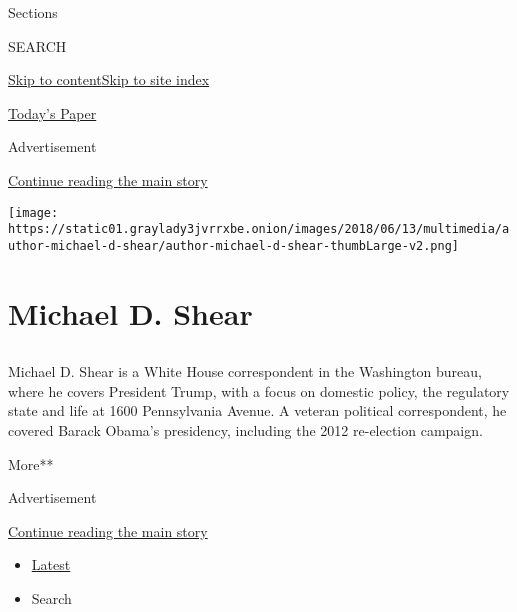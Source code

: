Sections

SEARCH

\protect\hyperlink{site-content}{Skip to
content}\protect\hyperlink{site-index}{Skip to site index}

\href{https://myaccount.nytimes3xbfgragh.onion/auth/login?response_type=cookie\&client_id=vi}{}

\href{https://www.nytimes3xbfgragh.onion/section/todayspaper}{Today's
Paper}

Advertisement

\protect\hyperlink{after-top}{Continue reading the main story}

\texttt{[image: https://static01.graylady3jvrrxbe.onion/images/2018/06/13/multimedia/author-michael-d-shear/author-michael-d-shear-thumbLarge-v2.png]}

\hypertarget{michael-d-shear}{%
\section{Michael D. Shear}\label{michael-d-shear}}

\hypertarget{section}{%
\subsection{}\label{section}}

Michael D. Shear is a White House correspondent in the Washington
bureau, where he covers President Trump, with a focus on domestic
policy, the regulatory state and life at 1600 Pennsylvania Avenue. A
veteran political correspondent, he covered Barack Obama's presidency,
including the 2012 re-election campaign.

More**

Advertisement

\protect\hyperlink{after-mid1}{Continue reading the main story}

\begin{itemize}
\tightlist
\item
  \protect\hyperlink{stream-panel}{Latest}
\item
  Search
\end{itemize}

